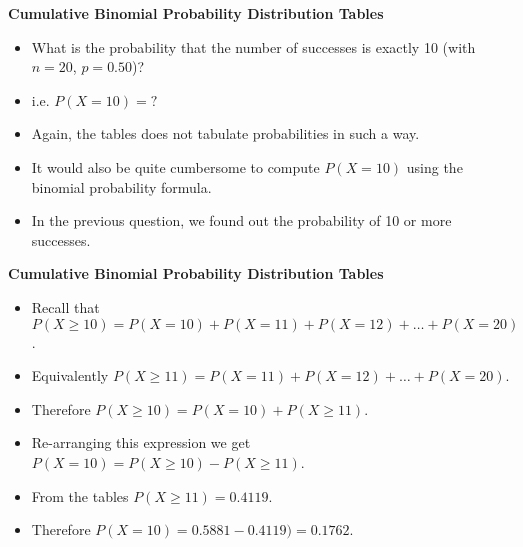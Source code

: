 \documentclass[a4]{beamer}
\begin{document}
{
\textbf{Cumulative Binomial Probability Distribution Tables}

\begin{itemize}
\item What is the probability that the number of successes is exactly 10 (with  $n=20$, $p=0.50$)?

\item i.e. $P(X = 10) = ?$

\item Again, the tables does not tabulate probabilities in such a way.

\item It would also be quite cumbersome to compute $P(X=10)$ using the binomial probability formula.

\item In the previous question, we found out the probability of 10 or more successes.
\end{itemize}
}

{
\textbf{Cumulative Binomial Probability Distribution Tables}
\normalsize
\begin{itemize}


\item Recall that $P(X \geq 10) = P(X=10) + P(X=11) + P(X=12)+ \ldots +  P(X=20)$.
\bigskip
\item Equivalently $P(X \geq 11) = P(X=11) + P(X=12)+ \ldots +  P(X=20)$.
\bigskip
\item Therefore $P(X \geq 10) = P(X=10) + P(X \geq 11)$.
\bigskip
\item Re-arranging this expression we get $P(X=10)  = P(X \geq 10) -  P(X \geq 11)$.

\bigskip
\item From the tables $P(X \geq 11) = 0.4119$.
\bigskip
\item Therefore $P(X=10) = 0.5881 -  0.4119)  = 0.1762$.
\end{itemize}
}
\end{document}
